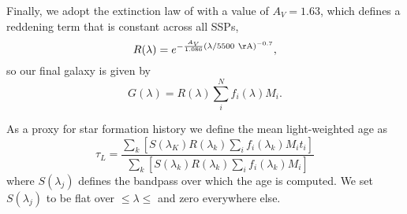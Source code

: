 Finally, we adopt the extinction law of \citet{Charlot00} with a value
of $A_V=1.63$, which defines a reddening term that is constant across all SSPs, 
\begin{equation}
R(\lambda) = e^{-\frac{A_V}{1.086} \left(\lambda/\val{5500}{\AA}\right)^{-0.7}},
\end{equation}
 so our final galaxy is given by
\begin{equation}
G(\lambda) = R(\lambda)\sum_i^N f_i(\lambda) M_i.
\end{equation}

As a proxy for star formation history we define the mean light-weighted age as
\begin{equation}
\label{TM:eq:MLWA}
\tau_L = \frac{\sum_k\left[S(\lambda_K) R(\lambda_k) \sum_i f_i(\lambda_k) M_i t_i\right]}{\sum_{k}\left[S(\lambda_k) R(\lambda_k) \sum_i f_i(\lambda_k) M_i\right]}
\end{equation}
where $S(\lambda_j)$ defines the bandpass over which the age is computed. We
set $S(\lambda_j)$ to be flat over  $\leq\lambda\leq$
 and zero everywhere else.


